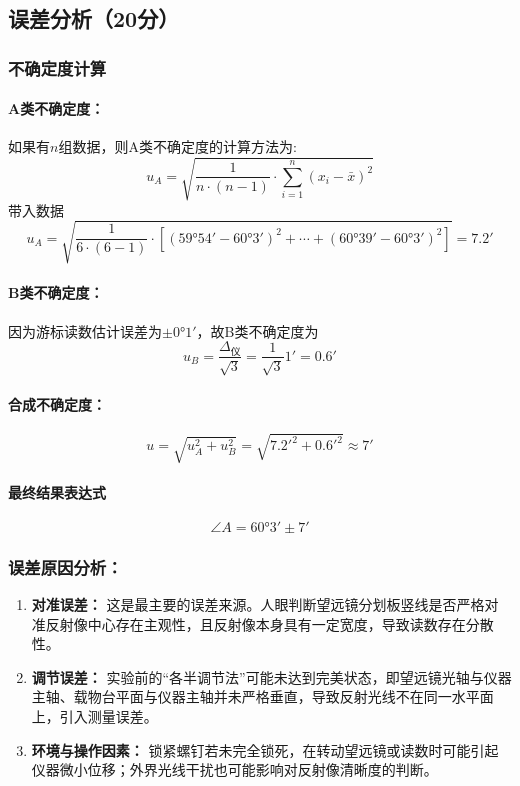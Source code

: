 \documentclass{../../templates/Report}%
\begin{document}
\subsection{误差分析（20分）}
\subsubsection{不确定度计算}
\paragraph{A类不确定度：}
如果有$n$组数据，则A类不确定度的计算方法为:
\[
u_A = \sqrt{\dfrac{1}{n \cdot (n - 1)} \cdot \sum_{i = 1}^n (x_i - \bar{x})^2}
\]
带入数据
\[
u_A = \sqrt{\frac{1}{6 \cdot (6 - 1)} \cdot \left[(\ang{59;54} - \ang{60;3})^2 + \cdots + (\ang{60;39} - \ang{60;3})^2\right]} = \ang{;7.2;}
\]
\paragraph{B类不确定度：}
因为游标读数估计误差为$\pm\ang{0;1}$，故B类不确定度为
\[
u_B = \frac{\Delta_\text{仪}}{\sqrt{3}} = \frac{1}{\sqrt{3}}\ang{;1} = \ang{;0.6;}
\]
\paragraph{合成不确定度：}
\[
u = \sqrt{u_A^2 + u_B^2} = \sqrt{\ang{;7.2;}^2 + \ang{;0.6;}^2} \approx \ang{;7;}
\]
\paragraph{最终结果表达式}
\[\boxed{\angle A = \ang{60;3} \pm \ang{;7;}}\]
\subsubsection{误差原因分析：}
\begin{enumerate}[label=(\arabic*)]
    \item \textbf{对准误差：} 这是最主要的误差来源。人眼判断望远镜分划板竖线是否严格对准反射像中心存在主观性，且反射像本身具有一定宽度，导致读数存在分散性。
    \item \textbf{调节误差：} 实验前的“各半调节法”可能未达到完美状态，即望远镜光轴与仪器主轴、载物台平面与仪器主轴并未严格垂直，导致反射光线不在同一水平面上，引入测量误差。
    \item \textbf{环境与操作因素：} 锁紧螺钉若未完全锁死，在转动望远镜或读数时可能引起仪器微小位移；外界光线干扰也可能影响对反射像清晰度的判断。
\end{enumerate}
\end{document}
